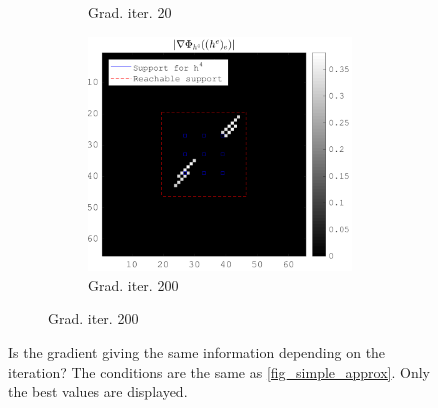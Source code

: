 \begin{figure}[!ht]
\begin{subfigure}[b]{0.49\textwidth}
\begin{subfigure}[b]{0.49\textwidth}
	\caption{Grad. iter. 20}
	\end{subfigure}
	\begin{subfigure}[b]{0.49\textwidth}\centering
	\includegraphics[width=\textwidth]{figures/xp_grad_iterations/xp_128x128_sc2_angl1_K3_S3_node4_partgrad4_bestvalues.png}
	\caption{Grad. iter. 200}
	\end{subfigure}
\end{subfigure}
\caption{Is the gradient giving the same information depending on the iteration? The conditions are the same as \cref{fig_simple_approx}. Only the best values are displayed.}\label{fig_iter_gain_vs_grad}
\end{figure}




